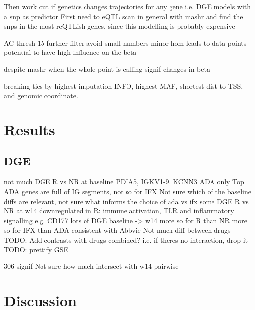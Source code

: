 \begin{outline}
Then work out if genetics changes trajectories for any gene i.e. DGE models with a snp as predictor
First need to eQTL scan in general with mashr and find the snps in the most reQTLish genes, since this modelling is probably expensive

AC thresh 15
further filter
avoid small numbers minor hom leads to data points 
potential to have high influence on the beta

    despite mashr
    when the whole point is calling signif changes in beta

breaking ties by highest imputation INFO, highest \gls{MAF}, shortest dist to \gls{TSS}, and genomic coordinate.

\section{Results}

\subsection{DGE}

not much DGE R vs NR at baseline
PDIA5, IGKV1-9, KCNN3 ADA only
Top ADA genes are full of IG segments, not so for IFX
Not sure which of the baseline diffs are relevant, not sure what informs the choice of ada vs ifx
some DGE R vs NR at w14
downregulated in R: immune activation, TLR and inflammatory signalling
e.g. CD177
lots of DGE baseline -> w14
more so for R than NR
more so for IFX than ADA
consistent with Abbvie
Not much diff between drugs
TODO: Add contrasts with drugs combined?
i.e. if theres no interaction, drop it
TODO: prettify GSE

306 signif
Not sure how much intersect with w14 pairwise

\section{Discussion}


%


\end{outline}
